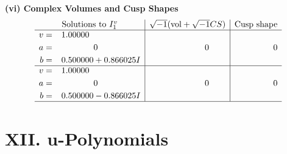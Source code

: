 \documentclass[1p]{elsarticle_modified}
\theoremstyle{definition}
\newcommand{\I}{\sqrt{-1}}
\begin{document}
\newpage\flushleft \textbf{(vi) Complex Volumes and Cusp Shapes}
$$\begin{array}{c|c|c}  
\text{Solutions to }I^v_{1}& \I (\text{vol} + \sqrt{-1}CS) & \text{Cusp shape}\\
 \hline 
\begin{aligned}
v &= \phantom{-}1.00000\phantom{ +0.000000I} \\
a &= \phantom{-0.000000 } 0 \\
b &= \phantom{-}0.500000 + 0.866025 I\end{aligned}
 & \phantom{-0.000000 } 0 & \phantom{-0.000000 } 0 \\ \hline\begin{aligned}
v &= \phantom{-}1.00000\phantom{ +0.000000I} \\
a &= \phantom{-0.000000 } 0 \\
b &= \phantom{-}0.500000 - 0.866025 I\end{aligned}
 & \phantom{-0.000000 } 0 & \phantom{-0.000000 } 0\\
 \hline 
 \end{array}$$\newpage
\newpage\renewcommand{\arraystretch}{1}
\centering \section*{ XII. u-Polynomials}
\end{document}
